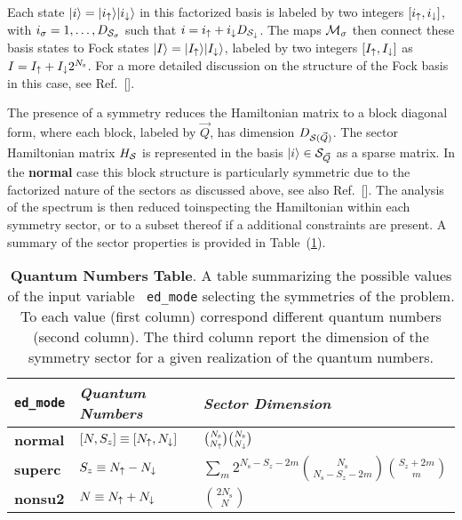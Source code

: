 \documentclass[edipack2.tex]{subfiles}
\begin{document}
Each state $|i\rangle=|i_\uparrow\rangle |i_\downarrow\rangle$ in this factorized basis
is labeled by two integers $[i_\uparrow,i_\downarrow]$, with 
$i_\sigma=1,\dots,D_{{\cal S}_\sigma}$ such that $i=i_\uparrow + i_\downarrow
D_{{\cal S}_\downarrow}$.
The maps ${\cal M}_\sigma$ then connect these basis states to Fock states
$|I\rangle=|I_\uparrow\rangle|I_\downarrow\rangle$, labeled by two integers
$[I_\uparrow,I_\downarrow]$ as $I=I_\uparrow +   I_\downarrow 2^{N_\mathrm{s}}$.
For a more
detailed discussion on the structure of the Fock basis in this case, see Ref.~[]. 

The presence of a symmetry reduces the Hamiltonian matrix to
a block diagonal form, where each block, labeled by $\vec{Q}$, has dimension
$D_{{\cal S}(\vec{Q})}$. The sector Hamiltonian matrix $H_{\cal S}$ is represented in the
basis $|i\rangle\in{\cal S}_{\vec{Q}}$ as a sparse matrix.
In the {\bf normal} case this block structure is particularly
symmetric due to the factorized nature of the sectors as discussed
above, see also Ref.~[].
The analysis of the spectrum is then reduced toinspecting the
Hamiltonian within each symmetry sector, or to a subset thereof if a
additional constraints are present.
A summary of the sector properties is provided in
Table~(\ref{TabSector}). 
\begin{table}%
  \label{TabSector}
\begin{center}
\begin{tabularx}{\linewidth}{ |X|X|X| } 
 \hline
  {\tt ed\_mode} & {\it Quantum Numbers} & {\it Sector Dimension} \\
  \hline
  {\bf normal} & $[N,S_z]\equiv[N_\uparrow,N_\downarrow]$ &
                                                $\binom{N_\mathrm{s}}{N_\uparrow}\binom{N_\mathrm{s}}{N_\downarrow}$
  \\
  \hline
  {\bf superc} & $S_z\equiv N_\uparrow-N_\downarrow$ &  $\sum_m 2^{N_\mathrm{s}-S_z-2m}\binom{N_\mathrm{s}}{N_\mathrm{s}-S_z-2m}\binom{S_z+2m}{m}$
  \\
  \hline
  {\bf nonsu2} & $N \equiv N_\uparrow+N_\downarrow$ & $\binom{2N_\mathrm{s}}{N}$ \\ 
 \hline
\end{tabularx}
\end{center}
\caption{
  {\bf Quantum Numbers Table}.
A table summarizing the possible values of the input variable {\tt
  ed\_mode} selecting the symmetries of the problem. To each value
(first column) correspond different quantum numbers (second column).
The third column report the dimension of the symmetry sector for a
given realization of the quantum numbers.}
\end{table}
\end{document}
